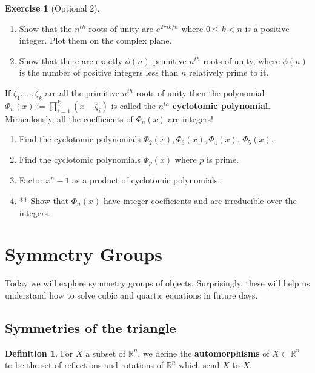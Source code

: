 \documentclass[reqno, 12pt, letter]{article}
\theoremstyle{plain}
\theoremstyle{definition}
\newtheorem{definition}[theorem]{Definition}
\newtheorem{exercise}[theorem]{Exercise}
\theoremstyle{remark}
\numberwithin{equation}{section}
\newcommand\br{{\mathbb R}}
\begin{document}
	\begin{exercise}[Optional 2] $ $
		\begin{enumerate}
			\item Show that the $ n^{th}$ roots of unity are $ e^{2 \pi i k / n}$ where $ 0 \le k < n$ is a positive integer. Plot them on the complex plane. 
			\item Show that there are exactly $ \phi(n)$ primitive $ n^{th}$ roots of unity, where $ \phi(n)$ is the number of positive integers less than $ n$ relatively prime to it.
		\end{enumerate}
		If $ \zeta_1, \dots, \zeta_k$ are all the primitive $ n^{th}$ roots of unity then the polynomial $ \Phi_n(x) := \prod _{i=1}^k (x - \zeta_i)$ is called the $ n^{th}$ \textbf{cyclotomic polynomial}. Miraculously, all the coefficients of $ \Phi_n(x)$ are integers!
		\begin{enumerate}[resume]
			\item Find the cyclotomic polynomials $ \Phi_2(x), \Phi_3(x), \Phi_4(x)$, $ \Phi_5(x)$.
			\item Find the cyclotomic polynomials $ \Phi_p(x)$ where $ p$ is prime.
			\item Factor $ x^n - 1$ as a product of cyclotomic polynomials.
			\item ** Show that $ \Phi_n(x)$ have integer coefficients and are irreducible over the integers.
		\end{enumerate}
	\end{exercise}
	

\newpage
\section{Symmetry Groups}

Today we will explore symmetry groups of objects. Surprisingly, these will help us understand
how to solve cubic and quartic equations in future days.

\subsection{Symmetries of the triangle}

\begin{definition}
	\label{definition:automorphisms}
	For $X$ a subset of $\br^n$, we define the {\bf automorphisms} of $X \subset \br^n$ to be the set of
	reflections and rotations of $\br^n$ which send $X$ to $X$.
\end{definition}
\end{document}
